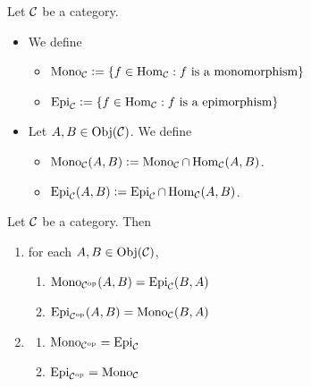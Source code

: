 \documentclass{book}
\begin{document}
	\begin{defn}
		Let $\MC$ be a category.
		\begin{itemize}
			\item We define 
			\begin{itemize}
				\item $\Mono_{\MC} \defeq \{f \in \Hom_{\MC}:\text{$f$ is a monomorphism}\}$
				\item $\Epi_{\MC} \defeq \{f \in \Hom_{\MC}:\text{$f$ is a epimorphism}\}$
			\end{itemize}
			\item Let $A, B \in \Obj(\MC)$. We define 
			\begin{itemize}
				\item $\Mono_{\MC}(A,B) \defeq \Mono_{\MC} \cap \Hom_{\MC}(A,B)$.
				\item $\Epi_{\MC}(A,B) \defeq \Epi_{\MC} \cap \Hom_{\MC}(A,B)$.
			\end{itemize}
		\end{itemize}
	\end{defn}
	
	\begin{ex}
		Let $\MC$ be a category. Then
		\begin{enumerate}
			\item for each $A,B \in \Obj(\MC)$,
			\begin{enumerate}
				\item $\Mono_{\op{\MC}}(A,B) = \Epi_{\MC}(B,A)$
				\item $\Epi_{\op{\MC}}(A,B) = \Mono_{\MC}(B,A)$
			\end{enumerate}
			\item 
			\begin{enumerate}
				\item $\Mono_{\op{\MC}} = \Epi_{\MC}$
				\item $\Epi_{\op{\MC}} = \Mono_{\MC}$
			\end{enumerate}
		\end{enumerate}
	\end{ex}
	
\end{document}
